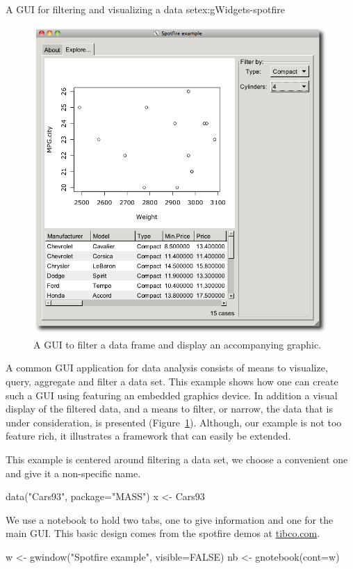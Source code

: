 \begin{example}{A GUI for filtering and visualizing a data set}{ex:gWidgets-spotfire}
\begin{figure}
  \centering
  \includegraphics[width=.6\textwidth]{fig-gWidgets-spotfire-gui}
  \caption{A GUI to filter a data frame and display an accompanying graphic.}
  \label{fig:gWidgets-spotfire-gui}
\end{figure}
A common GUI application for data analysis consists of means to
visualize, query, aggregate and filter a data set. This example shows
how one can create such a GUI using  featuring an
embedded graphics device. In addition a visual display of the filtered
data, and a means to filter, or narrow, the data that is under
consideration, is presented (Figure~\ref{fig:gWidgets-spotfire-gui}).
Although, our example is not too feature rich, it illustrates a
framework that can easily be extended.


This example is centered around filtering a data set, we choose a
convenient one and give it a non-specific name.
\begin{Schunk}
\begin{Sinput}
 data("Cars93", package="MASS")
 x <- Cars93
\end{Sinput}
\end{Schunk}

We use a notebook to hold two tabs, one to give information and one
for the main GUI. This basic design comes from the spotfire demos at \url{tibco.com}.
\begin{Schunk}
\begin{Sinput}
 w <- gwindow("Spotfire example", visible=FALSE)
 nb <- gnotebook(cont=w)
\end{Sinput}
\end{Schunk}



\end{example}

